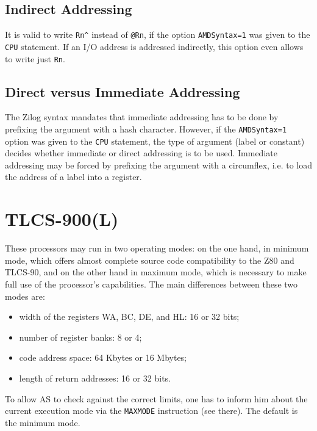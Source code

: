 \documentclass[12pt,twoside]{report}
\newcommand{\tty}[1]{{\tt #1}}
\newcommand{\asname}{{AS}}
\begin{document}
\subsection{Indirect Addressing}

It is valid to write \verb!Rn^! instead of \verb!@Rn!, if the option
\tty{AMDSyntax=1} was given to the \tty{CPU} statement.  If an I/O address
is addressed indirectly, this option even allows to write just \verb!Rn!.

\subsection{Direct versus Immediate Addressing}

The Zilog syntax mandates that immediate addressing has to be done by prefixing
the argument with a hash character.  However, if the \tty{AMDSyntax=1} option
was given to the \tty{CPU} statement, the type of argument (label or constant)
decides whether immediate or direct addressing is to be used.  Immediate addressing
may be forced by prefixing the argument with a circumflex, i.e. to load the address
of a label into a register.


\section{TLCS-900(L)}
\label{TLCS900Spec}

These processors may run in two operating modes: on the one hand, in
minimum mode, which offers almost complete source code compatibility
to the Z80 and TLCS-90, and on the other hand in maximum mode, which
is necessary to make full use of the processor's capabilities.  The
main differences between these two modes are:
\begin{itemize}
\item{width of the registers WA, BC, DE, and HL: 16 or 32 bits;}
\item{number of register banks: 8 or 4;}
\item{code address space: 64 Kbytes or 16 Mbytes;}
\item{length of return addresses: 16 or 32 bits.}
\end{itemize}
To allow \asname{} to check against the correct limits, one has to inform him
about the current execution mode via the \tty{MAXMODE} instruction (see
there).  The default is the minimum mode.
\end{document}
